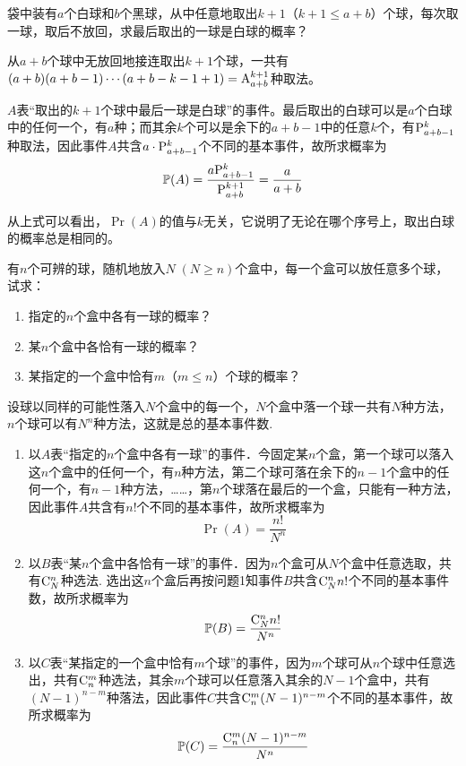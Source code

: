 \begin{example}
    袋中装有$a$个白球和$b$个黑球，从中任意地取出$k+1$（$k+1\le a+b$）个球，每次取一球，取后不放回，求最后取出的一球是白球的概率？
\end{example}

\begin{solution}
    从$a+b$个球中无放回地接连取出$k+1$个球，一共有
$(a+b)(a+b-1)\cdots(a+b-k-1+1)={\rm A}^{k+1}_{a+b}$种取法。

$A$表“取出的$k+1$个球中最后一球是白球”的事件。最后取出的白球可以是$a$个白球中的任何一个，有$a$种；而其余$k$个可以是余下的$a+b-1$中的任意$k$个，有${\rm P}^k_{a+b-1}$种取法，因此事件$A$共含$a\cdot {\rm P}^k_{a+b-1}$个不同的基本事件，故所求概率为
\[\Pr(A)=\frac{a{\rm P}^{k}_{a+b-1}}{{\rm P}^{k+1}_{a+b}}=\frac{a}{a+b}\]

从上式可以看出，$\Pr(A)$的值与$k$无关，它说明了无论在哪个序号上，取出白球的概率总是相同的。
\end{solution}

\begin{example}
    有$n$个可辨的球，随机地放入$N\; (N\ge n)$个盒中，每一个盒可以放任意多个球，试求：
\begin{enumerate}
\item 指定的$n$个盒中各有一球的概率？
\item 某$n$个盒中各恰有一球的概率？
\item 某指定的一个盒中恰有$m$（$m\le n$）个球的概率？
\end{enumerate}
\end{example}

\begin{solution}
    设球以同样的可能性落入$N$个盒中的每一个，$N$个盒中落一个球一共有$N$种方法，$n$个球可以有$N^n$种方法，这就是总的基本事件数.
\begin{enumerate}
\item 以$A$表“指定的$n$个盒中各有一球”的事件．今固定某$n$个盒，第一个球可以落入这$n$个盒中的任何一个，有$n$种方法，第二个球可落在余下的$n-1$个盒中的任何一个，有$n-1$种方法，……，第$n$个球落在最后的一个盒，只能有一种方法，因此事件$A$共含有$n!$个不同的基本事件，故所求概率为
\[\Pr(A)= \frac{n!}{N^n} \]
\item 以$B$表“某$n$个盒中各恰有一球”的事件．因为$n$个盒可从$N$个盒中任意选取，共有$\comb{n}{N}$种选法. 选出这$n$个盒后再按问题1知事件$B$共含$\comb{n}{N}n!$个不同的基本事件数，故所求概率为
\[\Pr(B)=\frac{\comb{n}{N}n!}{N^n}\]
\item 
以$C$表“某指定的一个盒中恰有$m$个球”的事件，因为$m$个球可从$n$个球中任意选出，共有$\comb{m}{n}$种选法，其余$m$个球可以任意落入其余的$N-1$个盒中，共有$(N-1)^{n-m}$种落法，因此事件$C$共含$\comb{m}{n}(N-1)^{n-m}$个不同的基本事件，故所求概率为
\[\Pr(C)=\frac{\comb{m}{n}(N-1)^{n-m}}{N^n}\]
\end{enumerate}
\end{solution}

